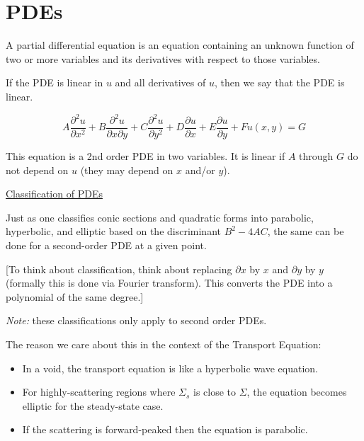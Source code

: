 \documentclass[12pt]{article}
\newcommand{\Macro}{\ensuremath{\Sigma}}
\begin{document}
\section{PDEs}

A partial differential equation is an equation containing an unknown function
of two or more variables and its derivatives with respect to those variables. 

If the PDE is linear in $u$ and all derivatives of $u$, then we say that the
PDE is linear.

\begin{equation}
A\frac{\partial^2 u}{\partial x^2} +
B\frac{\partial^2 u}{\partial x \partial  y} +
C\frac{\partial^2 u}{\partial y^2} +
D\frac{\partial u}{\partial x} +
E\frac{\partial u}{\partial y} + Fu(x,y) = G \nonumber
\end{equation}

This equation is a 2nd order PDE in two variables. It is linear if $A$ through
$G$ do not depend on $u$ (they may depend on $x$ and/or $y$). 

\vspace*{1em}
\underline{Classification of PDEs}

Just as one classifies conic sections and quadratic forms into parabolic, 
hyperbolic, and elliptic based on the discriminant $B^2 - 4AC$, the same can 
be done for a second-order PDE at a given point. 

[To think about classification, think about replacing $\partial x$ by $x$ and  
$\partial y$ by $y$ (formally this is done via Fourier transform). This 
converts the PDE into a polynomial of the same degree.]

\textit{Note:} these classifications only apply to second order PDEs. 

\noindent The reason we care about this in the context of the Transport 
Equation:

\begin{itemize}
\item In a void, the transport equation is like a hyperbolic wave equation. 
\item For highly-scattering regions where $\Macro_{s}$ is close to $\Macro$, 
      the equation becomes elliptic for the steady-state case. 
\item If the scattering is forward-peaked then the equation is parabolic.
\end{itemize}
\end{document}
